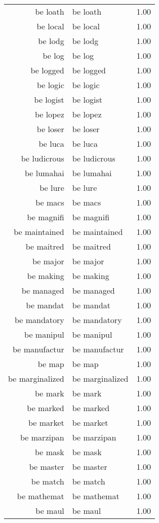 \begin{table}[ht]
\begin{tabular}{rlr}
  be loath & be loath & 1.00 \\ 
  be local & be local & 1.00 \\ 
  be lodg & be lodg & 1.00 \\ 
  be log & be log & 1.00 \\ 
  be logged & be logged & 1.00 \\ 
  be logic & be logic & 1.00 \\ 
  be logist & be logist & 1.00 \\ 
  be lopez & be lopez & 1.00 \\ 
  be loser & be loser & 1.00 \\ 
  be luca & be luca & 1.00 \\ 
  be ludicrous & be ludicrous & 1.00 \\ 
  be lumahai & be lumahai & 1.00 \\ 
  be lure & be lure & 1.00 \\ 
  be macs & be macs & 1.00 \\ 
  be magnifi & be magnifi & 1.00 \\ 
  be maintained & be maintained & 1.00 \\ 
  be maitred & be maitred & 1.00 \\ 
  be major & be major & 1.00 \\ 
  be making & be making & 1.00 \\ 
  be managed & be managed & 1.00 \\ 
  be mandat & be mandat & 1.00 \\ 
  be mandatory & be mandatory & 1.00 \\ 
  be manipul & be manipul & 1.00 \\ 
  be manufactur & be manufactur & 1.00 \\ 
  be map & be map & 1.00 \\ 
  be marginalized & be marginalized & 1.00 \\ 
  be mark & be mark & 1.00 \\ 
  be marked & be marked & 1.00 \\ 
  be market & be market & 1.00 \\ 
  be marzipan & be marzipan & 1.00 \\ 
  be mask & be mask & 1.00 \\ 
  be master & be master & 1.00 \\ 
  be match & be match & 1.00 \\ 
  be mathemat & be mathemat & 1.00 \\ 
  be maul & be maul & 1.00 \\ 

\end{tabular}
\end{table}
